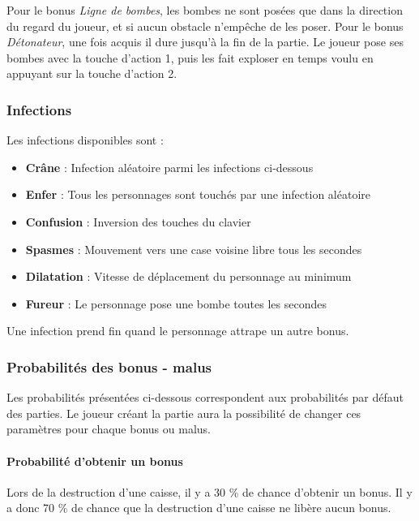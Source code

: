 \vspace{0.3cm}

Pour le bonus \textit{Ligne de bombes}, les bombes ne sont posées que dans la direction du regard du joueur, et si aucun obstacle n'empêche de les poser. Pour le bonus \textit{Détonateur}, une fois acquis il dure jusqu'à la fin de la partie. Le joueur pose ses bombes avec la touche d'action 1, puis les fait exploser en temps voulu en appuyant sur la touche d'action 2.

\subsubsection{Infections}

Les infections disponibles sont :
\begin{itemize}
\item \textbf{Crâne} : Infection aléatoire parmi les infections ci-dessous
\item \textbf{Enfer} : Tous les personnages sont touchés par une infection aléatoire
\item \textbf{Confusion} : Inversion des touches du clavier
\item \textbf{Spasmes} : Mouvement vers une case voisine libre tous les \nbSecondes secondes
\item \textbf{Dilatation} : Vitesse de déplacement du personnage au minimum
\item \textbf{Fureur} : Le personnage pose une bombe toutes les \nbSecondes secondes
\end{itemize}

\vspace{0.3cm}

Une infection prend fin quand le personnage attrape un autre bonus.

\subsubsection{Probabilités des bonus - malus}

Les probabilités présentées ci-dessous correspondent aux probabilités par défaut des parties. Le joueur créant la partie aura la possibilité de changer ces paramètres pour chaque bonus ou malus.

\paragraph{Probabilité d'obtenir un bonus}
Lors de la destruction d'une caisse, il y a 30 \% de chance d'obtenir un bonus. Il y a donc 70 \% de chance que la destruction d'une caisse ne libère aucun bonus.

